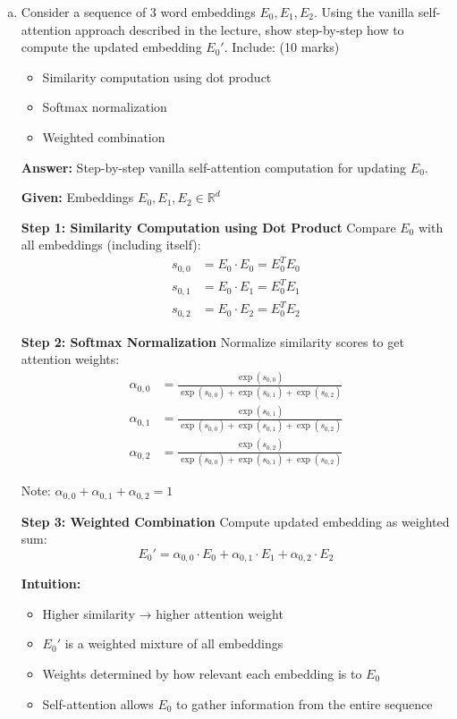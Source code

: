 \documentclass[12pt]{article}
\newcommand{\answer}[1]{{\color{answercolor}\textbf{Answer:} #1}}
\newcommand{\explanation}[1]{{\color{explanationcolor}#1}}
\begin{document}
\begin{enumerate}[(a)]
    \item Consider a sequence of 3 word embeddings $E_0, E_1, E_2$. Using the vanilla self-attention approach described in the lecture, show step-by-step how to compute the updated embedding $E_0'$. Include: \hfill (10 marks)
    \begin{itemize}
        \item Similarity computation using dot product
        \item Softmax normalization 
        \item Weighted combination
    \end{itemize}
    
    \answer{Step-by-step vanilla self-attention computation for updating $E_0$.}
    
    \explanation{
    \textbf{Given:} Embeddings $E_0, E_1, E_2 \in \mathbb{R}^d$
    
    \textbf{Step 1: Similarity Computation using Dot Product}
    Compare $E_0$ with all embeddings (including itself):
    \begin{align}
        s_{0,0} &= E_0 \cdot E_0 = E_0^T E_0 \\
        s_{0,1} &= E_0 \cdot E_1 = E_0^T E_1 \\
        s_{0,2} &= E_0 \cdot E_2 = E_0^T E_2
    \end{align}
    
    \textbf{Step 2: Softmax Normalization}
    Normalize similarity scores to get attention weights:
    \begin{align}
        \alpha_{0,0} &= \frac{\exp(s_{0,0})}{\exp(s_{0,0}) + \exp(s_{0,1}) + \exp(s_{0,2})} \\
        \alpha_{0,1} &= \frac{\exp(s_{0,1})}{\exp(s_{0,0}) + \exp(s_{0,1}) + \exp(s_{0,2})} \\
        \alpha_{0,2} &= \frac{\exp(s_{0,2})}{\exp(s_{0,0}) + \exp(s_{0,1}) + \exp(s_{0,2})}
    \end{align}
    
    Note: $\alpha_{0,0} + \alpha_{0,1} + \alpha_{0,2} = 1$
    
    \textbf{Step 3: Weighted Combination}
    Compute updated embedding as weighted sum:
    $$E_0' = \alpha_{0,0} \cdot E_0 + \alpha_{0,1} \cdot E_1 + \alpha_{0,2} \cdot E_2$$
    
    \textbf{Intuition:}
    \begin{itemize}
        \item Higher similarity → higher attention weight
        \item $E_0'$ is a weighted mixture of all embeddings
        \item Weights determined by how relevant each embedding is to $E_0$
        \item Self-attention allows $E_0$ to gather information from the entire sequence
    \end{itemize}
    }
    

\end{enumerate}
\end{document}
